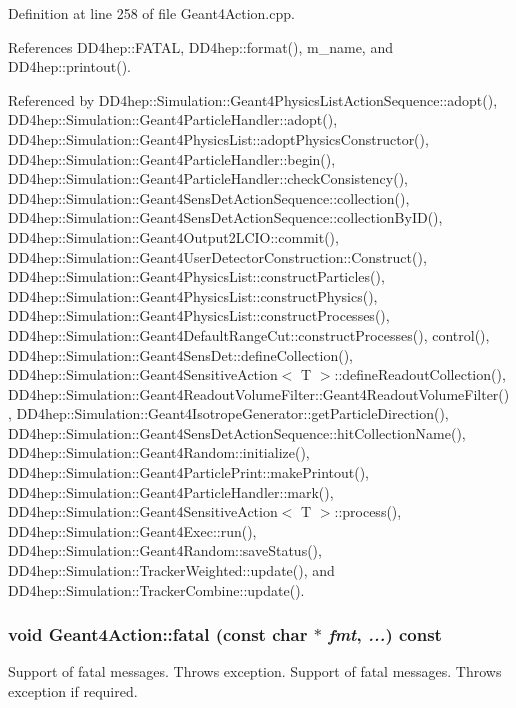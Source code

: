 Definition at line 258 of file Geant4Action.cpp.

References DD4hep::FATAL, DD4hep::format(), m\_\-name, and DD4hep::printout().

Referenced by DD4hep::Simulation::Geant4PhysicsListActionSequence::adopt(), DD4hep::Simulation::Geant4ParticleHandler::adopt(), DD4hep::Simulation::Geant4PhysicsList::adoptPhysicsConstructor(), DD4hep::Simulation::Geant4ParticleHandler::begin(), DD4hep::Simulation::Geant4ParticleHandler::checkConsistency(), DD4hep::Simulation::Geant4SensDetActionSequence::collection(), DD4hep::Simulation::Geant4SensDetActionSequence::collectionByID(), DD4hep::Simulation::Geant4Output2LCIO::commit(), DD4hep::Simulation::Geant4UserDetectorConstruction::Construct(), DD4hep::Simulation::Geant4PhysicsList::constructParticles(), DD4hep::Simulation::Geant4PhysicsList::constructPhysics(), DD4hep::Simulation::Geant4PhysicsList::constructProcesses(), DD4hep::Simulation::Geant4DefaultRangeCut::constructProcesses(), control(), DD4hep::Simulation::Geant4SensDet::defineCollection(), DD4hep::Simulation::Geant4SensitiveAction$<$ T $>$::defineReadoutCollection(), DD4hep::Simulation::Geant4ReadoutVolumeFilter::Geant4ReadoutVolumeFilter(), DD4hep::Simulation::Geant4IsotropeGenerator::getParticleDirection(), DD4hep::Simulation::Geant4SensDetActionSequence::hitCollectionName(), DD4hep::Simulation::Geant4Random::initialize(), DD4hep::Simulation::Geant4ParticlePrint::makePrintout(), DD4hep::Simulation::Geant4ParticleHandler::mark(), DD4hep::Simulation::Geant4SensitiveAction$<$ T $>$::process(), DD4hep::Simulation::Geant4Exec::run(), DD4hep::Simulation::Geant4Random::saveStatus(), DD4hep::Simulation::TrackerWeighted::update(), and DD4hep::Simulation::TrackerCombine::update().\hypertarget{class_d_d4hep_1_1_simulation_1_1_geant4_action_a80edeed66bdf7dc97aecb68f246a7b24}{
\subsubsection[{fatal}]{\setlength{\rightskip}{0pt plus 5cm}void Geant4Action::fatal (const char $\ast$ {\em fmt}, \/   {\em ...}) const}}
\label{class_d_d4hep_1_1_simulation_1_1_geant4_action_a80edeed66bdf7dc97aecb68f246a7b24}


Support of fatal messages. Throws exception. Support of fatal messages. Throws exception if required. 

